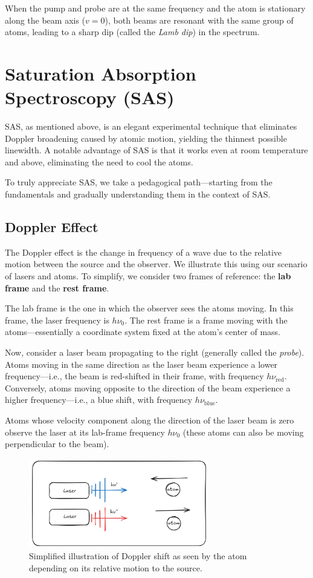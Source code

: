 \documentclass[a4paper, 12pt]{article}
\begin{document}
When the pump and probe are at the same frequency and the atom is stationary along the beam axis ($v=0$), both beams are resonant with the same group of atoms, leading to a sharp dip (called the \textit{Lamb dip}) in the spectrum.

\section{Saturation Absorption Spectroscopy (SAS)}
SAS, as mentioned above, is an elegant experimental technique that eliminates Doppler broadening caused by atomic motion, yielding the thinnest possible linewidth. A notable advantage of SAS is that it works even at room temperature and above, eliminating the need to cool the atoms.

To truly appreciate SAS, we take a pedagogical path—starting from the fundamentals and gradually understanding them in the context of SAS.

\subsection{Doppler Effect}
The Doppler effect is the change in frequency of a wave due to the relative motion between the source and the observer. We illustrate this using our scenario of lasers and atoms. To simplify, we consider two frames of reference: the \textbf{lab frame} and the \textbf{rest frame}.

The lab frame is the one in which the observer sees the atoms moving. In this frame, the laser frequency is $h\nu_0$. The rest frame is a frame moving with the atoms—essentially a coordinate system fixed at the atom’s center of mass.

Now, consider a laser beam propagating to the right (generally called the \textit{probe}). Atoms moving in the same direction as the laser beam experience a lower frequency—i.e., the beam is red-shifted in their frame, with frequency $h\nu_{\text{red}}$. Conversely, atoms moving opposite to the direction of the beam experience a higher frequency—i.e., a blue shift, with frequency $h\nu_{\text{blue}}$.

Atoms whose velocity component along the direction of the laser beam is zero observe the laser at its lab-frame frequency $h\nu_0$ (these atoms can also be moving perpendicular to the beam). 

\begin{figure}[htbp]
    \centering
    \includegraphics[width=0.7\textwidth]{doppler-shift.png}
    \caption{Simplified illustration of Doppler shift as seen by the atom depending on its relative motion to the source.}
\end{figure}
\end{document}
